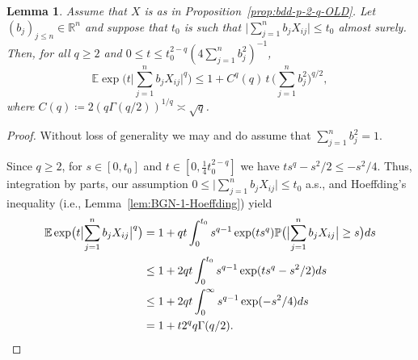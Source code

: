\documentclass[a4paper]{amsart}
\newtheorem{lemma}[theorem]{Lemma}
\theoremstyle{definition}
\theoremstyle{remark}
\numberwithin{equation}{section}
\newcommand*{\RR}{\mathbb{R}}
\newcommand*{\EE}{\mathbb{E}}
\newcommand*{\PP}{\mathbb{P}}
\begin{document}
\begin{lemma}
	\label{lem:BGN-2}
	Assume that $X$ is as in Proposition~\ref{prop:bdd-p-2-q-OLD}.
	Let $(b_j)_{j\leq n}\in \RR^n$ and suppose that $t_0$ is such that  $\bigl|\sum_{j=1}^n b_j X_{ij}\bigr|\leq t_0$ almost surely.
	Then, for all $q\geq 2$ and $0\leq t\leq {t_0^{2-q}}(4 \sum_{j=1}^n b_j^2)^{-1} $,
	\begin{equation}
	\label{eq:lem-BGN-2}
	\EE \exp\bigl(t\bigl|\sum_{j=1}^n b_j X_{ij}\bigr|^q \bigr)
	\leq 1 + C^q(q) \, t \, \bigl(\sum_{j=1}^n b_j^2  \bigr)^{q/2},
	\end{equation}
	where $C(q) \coloneqq
	2(q \Gamma(q/2))^{1/q} \asymp \sqrt{q} $.
\end{lemma}

\begin{proof}
	Without loss of generality we may and do assume that $\sum_{j=1}^n b_j^2=1$.
	
	Since $q\geq 2$, for $s\in[0,t_0]$ and $t\in [0,\frac14 t_0^{2-q}]$ we have  $ts^q - s^2/2 \leq - s^2/4$.
	Thus,
	integration by parts, our assumption  $0\leq \bigl|\sum_{j=1}^n b_j X_{ij}\bigr|\leq t_0$ a.s.,
	and Hoeffding's inequality (i.e., Lemma~\ref{lem:BGN-1-Hoeffding}) yield
	\begin{align*}
	\EE \exp\bigl(t\bigl|\sum_{j=1}^n b_j X_{ij}\bigr|^q \bigr)
	&=  1 + qt \int_0^{t_0} s^{q-1} \exp(ts^q) \PP\bigl(\bigl|\sum_{j=1}^n b_j X_{ij}\bigr|\geq s \bigr) ds\\
	&\leq 1 + 2qt \int_0^{t_0} s^{q-1} \exp(ts^q - s^2/2) ds\\
	&\leq 1 + 2qt \int_0^{\infty} s^{q-1} \exp(- s^2/4) ds\\	
	& = 1 + t 2^q q \Gamma(q/2).
	\qedhere
	\end{align*}
\end{proof}
\end{document}

